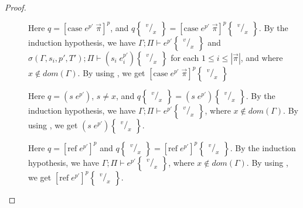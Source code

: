 \documentclass[../../master.tex]{subfiles}
\begin{document}
\begin{proof}
\begin{description}
		\item[] Here $q=[\mbox{case}\;e^{p'}\;\vec{\pi}]^p$, and $q\begin{Bmatrix} ^v/_x \end{Bmatrix}=[\mbox{case}\;e^{p'}\;\vec{\pi}]^p\begin{Bmatrix} ^v/_x \end{Bmatrix}$.
			By the induction hypothesis, we have $\Gamma;\Pi\vdash e^{p'}\begin{Bmatrix} ^v/_x \end{Bmatrix}$ and $\sigma(\Gamma,s_i,p',T');\Pi\vdash (s_i\;e_i^{p'})\begin{Bmatrix} ^v/_x \end{Bmatrix}$ for each $1\leq i \leq |\vec{\pi}|$, and where $x\notin dom(\Gamma)$.
			By using , we get $[\mbox{case}\;e^{p'}\;\vec{\pi}]^p\begin{Bmatrix} ^v/_x \end{Bmatrix}$

		\item[] Here $q=(s\;e^{p'})$, $s\neq x$, and $q\begin{Bmatrix} ^v/_x \end{Bmatrix}=(s\;e^{p'})\begin{Bmatrix} ^v/_x \end{Bmatrix}$.
		By the induction hypothesis, we have $\Gamma;\Pi\vdash e^{p'}\begin{Bmatrix} ^v/_x \end{Bmatrix}$, where $x\notin dom(\Gamma)$.
		By using , we get $(s\;e^{p'})\begin{Bmatrix} ^v/_x \end{Bmatrix}$.

		\item[] Here $q=[\mbox{ref}\;e^{p'}]^{p}$ and $q\begin{Bmatrix} ^v/_x \end{Bmatrix}=[\mbox{ref}\;e^{p'}]^{p}\begin{Bmatrix} ^v/_x \end{Bmatrix}$.
		By the induction hypothesis, we have $\Gamma;\Pi\vdash e^{p'}\begin{Bmatrix} ^v/_x \end{Bmatrix}$, where $x\notin dom(\Gamma)$.
		By using , we get $[\mbox{ref}\;e^{p'}]^{p}\begin{Bmatrix} ^v/_x \end{Bmatrix}$.



\end{description}
\end{proof}
\end{document}
